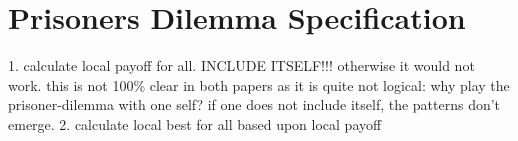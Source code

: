 \section{Prisoners Dilemma Specification}

1. calculate local payoff for all. INCLUDE ITSELF!!! otherwise it would not work. this is not 100\% clear in both papers as it is quite not logical: why play the prisoner-dilemma with one self? if one does not include itself, the patterns don't emerge.
2. calculate local best for all based upon local payoff
